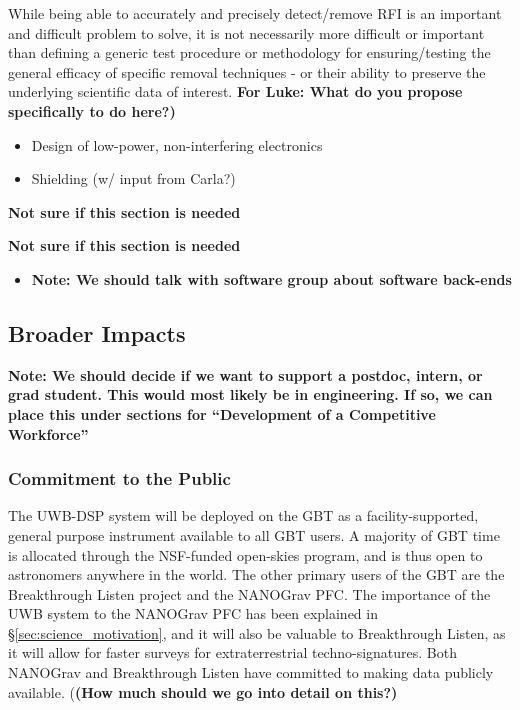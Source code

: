 \documentclass[10pt]{myNSF}
\begin{document}
 While being able to
accurately and precisely detect/remove RFI is an important and
difficult problem to solve, it is not necessarily more difficult or
important than defining a generic test procedure or methodology for
ensuring/testing the general efficacy of specific removal techniques -
or their ability to preserve the underlying scientific data of
interest. \textbf{For Luke: What do you propose specifically to do
  here?)}

\begin{itemize}
\item{Design of low-power, non-interfering electronics}
\item{Shielding (w/ input from Carla?)}
\end{itemize}

 \textbf{Not sure if this
  section is needed}

 \textbf{Not sure if this
  section is needed}
\begin{itemize}
\item{\textbf{Note: We should talk with software group about
      software back-ends}}
\end{itemize}

\subsection{Broader Impacts}
\label{sec:BI}

\textbf{Note: We should decide if we want to support a postdoc,
  intern, or grad student.  This would most likely be in engineering.
  If so, we can place this under sections for ``Development of a
  Competitive Workforce''}

\subsubsection{Commitment to the Public}
\label{sec:commitment}

The UWB-DSP system will be deployed on the GBT as a
facility-supported, general purpose instrument available to all GBT
users.  A majority of GBT time is allocated through the NSF-funded
open-skies program, and is thus open to astronomers anywhere in the
world.  The other primary users of the GBT are the Breakthrough Listen
project and the NANOGrav PFC.  The importance of the UWB system to the
NANOGrav PFC has been explained in \S\ref{sec:science_motivation}, and
it will also be valuable to Breakthrough Listen, as it will allow for
faster surveys for extraterrestrial techno-signatures.  Both NANOGrav
and Breakthrough Listen have committed to making data publicly
available. (\textbf{(How much should we go into detail on this?)}
\end{document}
